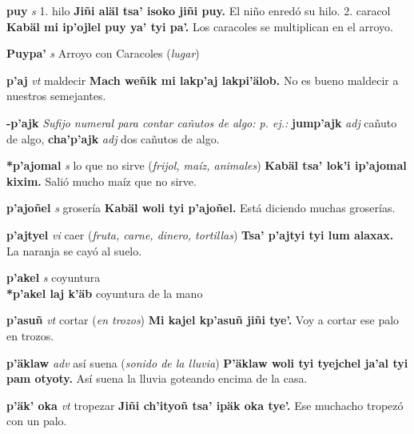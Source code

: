 \documentclass[10pt]{scrbook}
\newcommand{\entry}[1]{\textbf{#1}}
\newcommand{\alphaletter}[1]{\end{multicols}\addsec{#1}\begin{multicols}{2}}
\newcommand{\onedefinition}[1]{#1.}
\newcommand{\nontranslationdef}[1]{\textit{#1}}
\newcommand{\partofspeech}[1]{\textit{#1}}
\newcommand{\spanishtranslation}[1]{#1}
\newcommand{\clarification}[1]{(\textit{#1})}
\newcommand{\cholexample}[1]{\textbf{#1}}
\newcommand{\exampletranslation}[1]{#1}
\newcommand{\secondaryentry}[1]{\\\textbf{#1}}
\newcommand{\secondtranslation}[1]{#1}
\begin{document}
\begin{multicols}{2}
\entry{puy}
\partofspeech{s}
\onedefinition{1}
\spanishtranslation{hilo}
\cholexample{Jiñi aläl tsa' isoko jiñi puy.}
\exampletranslation{El niño enredó su hilo.}
\onedefinition{2}
\spanishtranslation{caracol}
\cholexample{Kabäl mi ip'ojlel puy ya' tyi pa'.}
\exampletranslation{Los caracoles se multiplican en el arroyo.}

\entry{Puypa'}
\partofspeech{s}
\spanishtranslation{Arroyo con Caracoles}
\clarification{lugar}

\alphaletter{P'}

\entry{p'aj}
\partofspeech{vt}
\spanishtranslation{maldecir}
\cholexample{Mach weñik mi lakp'aj lakpi'älob.}
\exampletranslation{No es bueno maldecir a nuestros semejantes.}

\entry{-p'ajk}
\nontranslationdef{Sufijo numeral para contar cañutos de algo: p. ej.:}
\cholexample{jump'ajk}
\partofspeech{adj}
\exampletranslation{cañuto de algo,}
\cholexample{cha'p'ajk}
\partofspeech{adj}
\exampletranslation{dos cañutos de algo.}

\entry{*p'ajomal}
\partofspeech{s}
\spanishtranslation{lo que no sirve}
\clarification{frijol, maíz, animales}
\cholexample{Kabäl tsa' lok'i ip'ajomal kixim.}
\exampletranslation{Salió mucho maíz que no sirve.}

\entry{p'ajoñel}
\partofspeech{s}
\spanishtranslation{grosería}
\cholexample{Kabäl woli tyi p'ajoñel.}
\exampletranslation{Está diciendo muchas groserías.}

\entry{p'ajtyel}
\partofspeech{vi}
\spanishtranslation{caer}
\clarification{fruta, carne, dinero, tortillas}
\cholexample{Tsa' p'ajtyi tyi lum alaxax.}
\exampletranslation{La naranja se cayó al suelo.}

\entry{p'akel}
\partofspeech{s}
\spanishtranslation{coyuntura}
\secondaryentry{*p'akel laj k'äb}
\secondtranslation{coyuntura de la mano}

\entry{p'asuñ}
\partofspeech{vt}
\spanishtranslation{cortar}
\clarification{en trozos}
\cholexample{Mi kajel kp'asuñ jiñi tye'.}
\exampletranslation{Voy a cortar ese palo en trozos.}

\entry{p'äklaw}
\partofspeech{adv}
\spanishtranslation{así suena}
\clarification{sonido de la lluvia}
\cholexample{P'äklaw woli tyi tyejchel ja'al tyi pam otyoty.}
\exampletranslation{Así suena la lluvia goteando encima de la casa.}

\entry{p'äk' oka}
\partofspeech{vt}
\spanishtranslation{tropezar}
\cholexample{Jiñi ch'ityoñ tsa' ipäk oka tye'.}
\exampletranslation{Ese muchacho tropezó con un palo.}


\end{multicols}
\end{document}
